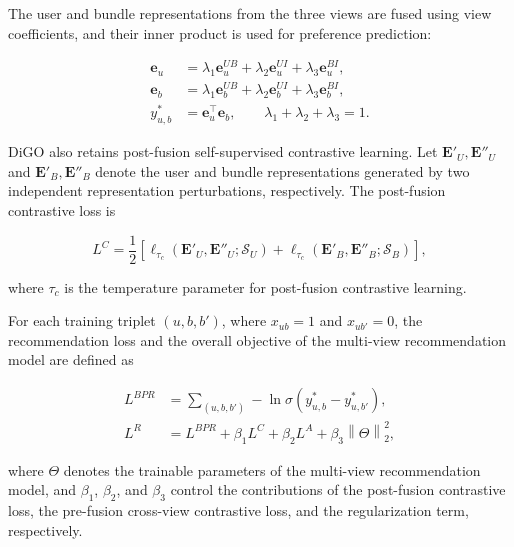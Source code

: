 \documentclass[letterpaper]{article}
\begin{document}
The user and bundle representations from the three views are
fused using view coefficients, and their inner product is used
for preference prediction:

\begin{equation}
\begin{aligned}
\mathbf e_u
&=
\lambda_1\mathbf e_u^{UB}
+
\lambda_2\mathbf e_u^{UI}
+
\lambda_3\mathbf e_u^{BI},
\\
\mathbf e_b
&=
\lambda_1\mathbf e_b^{UB}
+
\lambda_2\mathbf e_b^{UI}
+
\lambda_3\mathbf e_b^{BI},
\\
y^*_{u,b}
&=
\mathbf e_u^\top\mathbf e_b,
\qquad
\lambda_1+\lambda_2+\lambda_3=1.
\end{aligned}
\tag{10}
\end{equation}

DiGO also retains post-fusion self-supervised contrastive
learning. Let $\mathbf E'_U,\mathbf E''_U$ and
$\mathbf E'_B,\mathbf E''_B$ denote the user and bundle
representations generated by two independent representation
perturbations, respectively. The post-fusion contrastive loss is

\begin{equation}
L^{C}
=
\frac{1}{2}
\left[
\ell_{\tau_c}
\left(
\mathbf E'_U,
\mathbf E''_U;
\mathcal S_U
\right)
+
\ell_{\tau_c}
\left(
\mathbf E'_B,
\mathbf E''_B;
\mathcal S_B
\right)
\right],
\tag{11}
\end{equation}

where $\tau_c$ is the temperature parameter for post-fusion
contrastive learning.

For each training triplet $(u,b,b')$, where $x_{ub}=1$ and
$x_{ub'}=0$, the recommendation loss and the overall objective
of the multi-view recommendation model are defined as

\begin{equation}
\begin{aligned}
L^{BPR}
&=
\sum_{(u,b,b')}
-\ln
\sigma
\left(
y^*_{u,b}
-
y^*_{u,b'}
\right),
\\
L^{R}
&=
L^{BPR}
+
\beta_1L^{C}
+
\beta_2L^{A}
+
\beta_3
\left\|
\Theta
\right\|_2^2,
\end{aligned}
\tag{12}
\end{equation}

where $\Theta$ denotes the trainable parameters of the multi-view
recommendation model, and $\beta_1$, $\beta_2$, and $\beta_3$
control the contributions of the post-fusion contrastive loss,
the pre-fusion cross-view contrastive loss, and the regularization
term, respectively.
\end{document}
